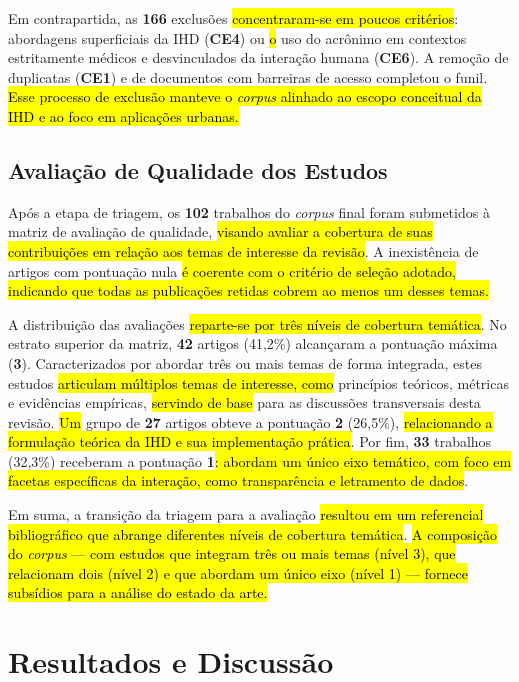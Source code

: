 \documentclass[12pt]{article}
\begin{document}
Em contrapartida, as \textbf{166} exclusões \hl{concentraram-se em poucos critérios}: abordagens superficiais da IHD (\textbf{CE4}) ou \hl{o} uso do acrônimo em contextos estritamente médicos e desvinculados da interação humana (\textbf{CE6}). A remoção de duplicatas (\textbf{CE1}) e de documentos com barreiras de acesso completou o funil. \hl{Esse processo de exclusão manteve o \textit{corpus} alinhado ao escopo conceitual da IHD e ao foco em aplicações urbanas.}

\subsection{Avaliação de Qualidade dos Estudos}

    Após a etapa de triagem, os \textbf{102} trabalhos do \textit{corpus} final foram submetidos à matriz de avaliação de qualidade, \hl{visando avaliar a cobertura de suas contribuições em relação aos temas de interesse da revisão}. A inexistência de artigos com pontuação nula \hl{é coerente com o critério de seleção adotado, indicando que todas as publicações retidas cobrem ao menos um desses temas.}

    A distribuição das avaliações \hl{reparte-se por três níveis de cobertura temática}. No estrato superior da matriz, \textbf{42} artigos (41,2\%) alcançaram a pontuação máxima (\textbf{3}). Caracterizados por abordar três ou mais temas de forma integrada, estes estudos \hl{articulam múltiplos temas de interesse, como} princípios teóricos, métricas e evidências empíricas, \hl{servindo de base} para as discussões transversais desta revisão. \hl{Um} grupo de \textbf{27} artigos obteve a pontuação \textbf{2} (26,5\%), \hl{relacionando a formulação teórica da IHD e sua implementação prática}. Por fim, \textbf{33} trabalhos (32,3\%) receberam a pontuação \textbf{1}\hl{: abordam um único eixo temático, com foco em facetas específicas da interação, como transparência e letramento de dados}.

    Em suma, a transição da triagem para a avaliação \hl{resultou em um referencial bibliográfico que abrange diferentes níveis de cobertura temática}. \hl{A composição do \textit{corpus} --- com estudos que integram três ou mais temas (nível 3), que relacionam dois (nível 2) e que abordam um único eixo (nível 1) --- fornece subsídios para a análise do estado da arte.}

\section{Resultados e Discussão}
\label{sec:resultados}
\end{document}
